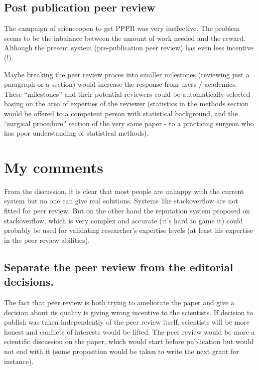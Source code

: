 \documentclass[]{article}
\begin{document}
\subsection{Post publication peer
review}\label{post-publication-peer-review}

The campaign of scienceopen to get PPPR was very ineffective. The
problem seems to be the inbalance between the amount of work needed and
the reward. Although the present system (pre-publication peer review)
has even less incentive (!).

Maybe breaking the peer review proces into smaller milestones (reviewing
just a paragraph or a section) would increase the response from users /
academics. These ``milestones'' and their potential reviewers could be
automatically selected basing on the area of experties of the reviewer
(statistics in the methods section would be offered to a competent
person with statistical background, and the ``surgical procedure''
section of the very same paper - to a practicing surgeon who has poor
understanding of statistical methods).

\section{My comments}\label{my-comments}

From the discussion, it is clear that most people are unhappy with the
current system but no one can give real solutions. Systems like
stackoverflow are not fitted for peer review. But on the other hand the
reputation system proposed on stackoverflow, which is very complex and
accurate (it's hard to game it) could probably be used for validating
researcher's expertise levels (at least his expertise in the peer review
abilities).

\subsection{Separate the peer review from the editorial
decisions.}\label{separate-the-peer-review-from-the-editorial-decisions.}

The fact that peer review is both trying to ameliorate the paper and
give a decision about its quality is giving wrong incentive to the
scientists. If decision to publish was taken independently of the peer
review itself, scientists will be more honest and conflicts of interests
would be lifted. The peer review would be more a scientific discussion
on the paper, which would start before publication but would not end
with it (some proposition would be taken to write the next grant for
instance).
\end{document}
